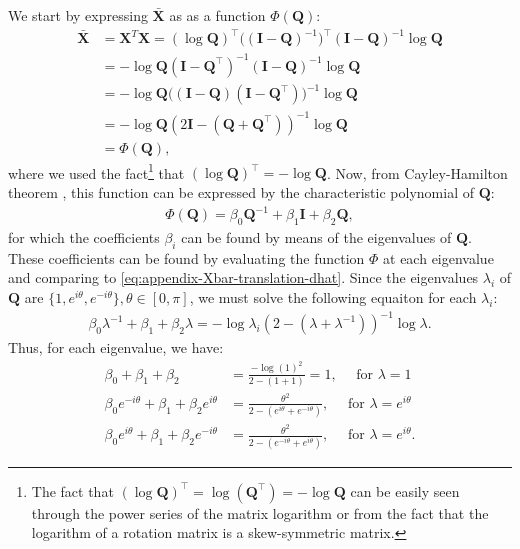 We start by expressing $\bar{\mathbf{X}}$ as as a function $\Phi(\mathbf{Q})$:
\begin{align}
    \bar{\mathbf{X}} &= \mathbf{X}^T\mathbf{X} = (\log\mathbf{Q})^\top\bigl((\mathbf{I} - \mathbf{Q})^{-1}\bigr)^\top(\mathbf{I} - \mathbf{Q})^{-1}\log\mathbf{Q}\\
    &= -\log\mathbf{Q}(\mathbf{I} - \mathbf{Q}^\top)^{-1}(\mathbf{I} - \mathbf{Q})^{-1}\log\mathbf{Q}\\
    &=-\log\mathbf{Q}\bigl((\mathbf{I} - \mathbf{Q})(\mathbf{I} - \mathbf{Q}^\top)\bigr)^{-1}\log\mathbf{Q}\\
    &=-\log\mathbf{Q}(2\mathbf{I}-(\mathbf{Q}+\mathbf{Q}^\top))^{-1}\log\mathbf{Q} \label{eq:appendix-Xbar-translation-dhat}\\
    &= \Phi(\mathbf{Q}),
\end{align}
where we used the fact\footnote{The fact that $(\log\mathbf{Q})^\top = \log(\mathbf{Q}^\top) = -\log\mathbf{Q}$ can be easily seen through the power series of the matrix logarithm or from the fact that the logarithm of a rotation matrix is a skew-symmetric matrix.} that $(\log\mathbf{Q})^\top=-\log\mathbf{Q}$. Now, from Cayley-Hamilton theorem \citep[p. 63]{Chen2009}, this function can be expressed by the characteristic polynomial of $\mathbf{Q}$:
\begin{align}
    \Phi(\mathbf{Q}) = \beta_0\mathbf{Q}^{-1} + \beta_1\mathbf{I} + \beta_2\mathbf{Q},
\end{align}
for which the coefficients $\beta_i$ can be found by means of the eigenvalues of $\mathbf{Q}$. These coefficients can be found by evaluating the function $\Phi$ at each eigenvalue and comparing to \eqref{eq:appendix-Xbar-translation-dhat}. Since the eigenvalues $\lambda_i$ of $\mathbf{Q}$ are $\{1, e^{i\theta}, e^{-i\theta}\},\theta\in[0,\pi]$, we must solve the following equaiton for each $\lambda_i$:
\begin{align}
    \beta_0\lambda^{-1} + \beta_1 + \beta_2\lambda = -\log\lambda_i(2-(\lambda+\lambda^{-1}))^{-1}\log\lambda.
\end{align}
Thus, for each eigenvalue, we have:
\begin{align}
        \beta_0 + \beta_1 + \beta_2 &= \frac{-\log(1)^2}{2 - (1+1)}=1,\quad\text{ for }\lambda = 1 \label{eq:appendix-cayley-lambda1}\\
        \beta_0 e^{-i\theta} + \beta_1 + \beta_2 e^{i\theta} &= \frac{\theta^2}{2 - (e^{i\theta}+ e^{-i\theta})},\quad\text{ for }\lambda = e^{i\theta} \label{eq:appendix-cayley-lambdaeitheta}\\ 
        \beta_0 e^{i\theta} + \beta_1 + \beta_2 e^{-i\theta} &= \frac{\theta^2}{2 - (e^{-i\theta}+ e^{i\theta})},\quad\text{ for }\lambda = e^{i\theta}. \label{eq:appendix-cayley-lambdaMINUSeitheta}
\end{align}
